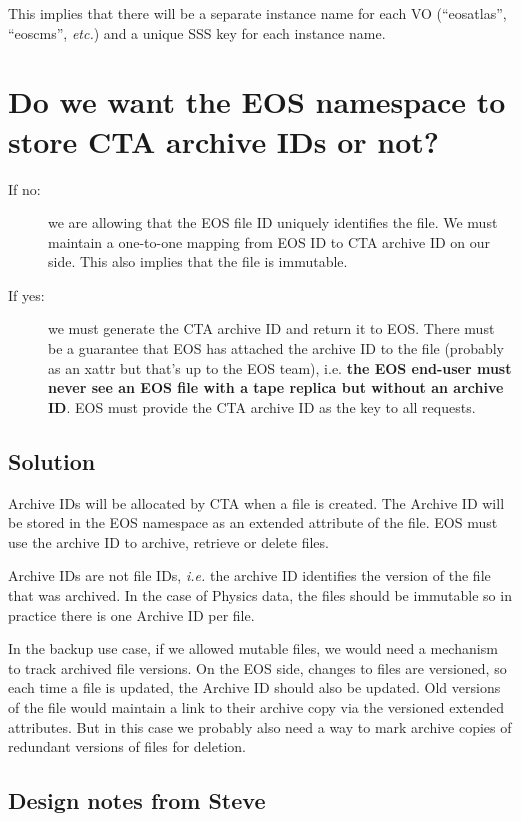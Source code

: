 This implies that there will be a separate instance name for each VO (``eosatlas'', ``eoscms'', \textit{etc.}) and a
unique SSS key for each instance name.

\section{Do we want the EOS namespace to store CTA archive IDs or not? \resolved}

\begin{description}
   \item[If no:] we are allowing that the EOS file ID uniquely identifies the file. We must maintain a one-to-one mapping
      from EOS ID to CTA archive ID on our side. This also implies that the file is immutable.
   \item[If yes:] we must generate the CTA archive ID and return it to EOS. There must be a guarantee that EOS has attached
      the archive ID to the file (probably as an xattr but that's up to the EOS team), i.e. \textbf{the EOS end-user must
      never see an EOS file with a tape replica but without an archive ID}. EOS must provide the CTA archive ID as the
      key to all requests. 
\end{description}

\subsection*{Solution}

Archive IDs will be allocated by CTA when a file is created. The Archive ID will be stored in the EOS
namespace as an extended attribute of the file. EOS must use the archive ID to archive, retrieve or delete files.

Archive IDs are not file IDs, \textit{i.e.} the archive ID identifies the version of the file that was archived. In the
case of Physics data, the files should be immutable so in practice there is one Archive ID per file.

In the backup use case, if we allowed mutable files, we would need a mechanism to track archived file versions. On the
EOS side, changes to files are versioned, so each time a file is updated, the Archive ID should also be updated.
Old versions of the file would maintain a link to their archive copy via the versioned extended attributes. But in this
case we probably also need a way to mark archive copies of redundant versions of files for deletion.

\subsection*{Design notes from Steve}

